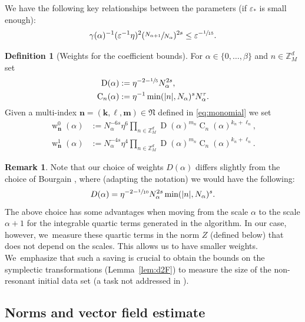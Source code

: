 \documentclass[JEP,XML,SOM,Unicode,published]{cedram}
\DeclareMathOperator{\rw}{w}
\theoremstyle{plain}
\theoremstyle{definition}
\newtheorem{definition}[theorem]{Definition}
\newtheorem{remark}[theorem]{Remark}
\newcommand{\nb}{{\boldsymbol n}}
\newcommand{\kb}{{\boldsymbol k}}
\newcommand{\lb}{{\boldsymbol \ell}}
\newcommand{\mb}{{\boldsymbol m}}
\newcommand{\Nb}{{\boldsymbol{\mathfrak{N}}}}
\newcommand{\Z}{\mathbb{Z}}
\newcommand{\1}{\mathbf{1}}
\let\epsilon\varepsilon
\begin{document}
We have the following key relationships between the parameters (if $\epsilon_{\ast}$ is small enough):
\begin{align}
\label{eq:par}
\gamma(\alpha)^{-1}(\epsilon^{-1}\eta)^{2}(\sfrac{N_{\alpha+1}}{N_{\alpha}})^{2s}
\leq \epsilon^{-\sfrac{1}{15}}.
\end{align}


\begin{definition}[Weights for the coefficient bounds]
\label{def:weight}
For $\alpha\in\{0,\dots,\beta\}$ and $n\in\Z_{M}^{d}$ set
\begin{align*}
\operatorname{D}(\alpha) &:= \eta^{-2-\sfrac{1}{5}}N_\alpha^{2s},\\
\operatorname{C}_{n}(\alpha) &:= \eta^{-1}\min(|n|, N_\alpha)^{s}N_{\alpha}^\tau.
\end{align*}
Given a multi-index $\nb=(\kb,\lb,\mb)\in\Nb$ defined in \eqref{eq:monomial} we set
\begin{align*}
\rw_{\nb}^{0}(\alpha) &:= N_\alpha^{-6s}\eta^{6}\prod_{n\in\Z_{M}^{d}}\operatorname{D}(\alpha)^{m_n}\operatorname{C}_{n}(\alpha)^{k_n+\ell_n},\\
\tag*{and}
\rw^1_{\nb}(\alpha) &:= N_\alpha^{-4s}\eta^4\prod_{n\in\Z_{M}^{d}}\operatorname{D}(\alpha)^{m_n}\operatorname{C}_{n}(\alpha)^{k_n+\ell_n}.
\end{align*}
\end{definition}
\begin{remark} \label{rq:comp_bou}
Note that our choice of weights $D(\alpha)$ differs slightly from the choice of Bourgain \cite{Bou00}, where (adapting the notation) we would have the following:
\[
D(\alpha) = \eta^{-2-\sfrac{1}{10}}N_{\alpha}^{2s}\min(|n|, N_{\alpha})^{s}.
\]
The above choice has some advantages when moving from the scale $\alpha$ to the scale $\alpha+1$ for the integrable quartic terms generated in the algorithm. In our case, however, we~measure these quartic terms in the norm $Z$ (defined below) that does not depend on the scales. This allows us to have smaller weights. We~emphasize that such a saving is crucial to obtain the bounds on the symplectic transformations (\eg Lemma~\ref{lem:d2F}) to measure the size of the non-resonant initial data set (a task not addressed in \cite{Bou00}).
\end{remark}

\subsection{Norms and vector field estimate}
\end{document}
